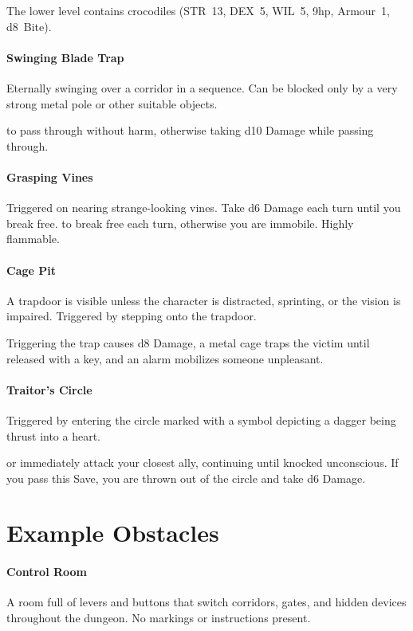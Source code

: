 \documentclass[itdr]{subfiles}
\begin{document}
The lower level contains crocodiles (STR~13, DEX~5, WIL~5, 9hp, Armour~1, d8~Bite).

\paragraph{Swinging Blade Trap}
Eternally swinging over a corridor in a sequence. Can be blocked only by a very strong metal pole or other suitable objects.

 to pass through without harm, otherwise taking d10 Damage while passing through.

\paragraph{Grasping Vines}
Triggered on nearing strange-looking vines. Take d6 Damage each turn until you break free.  to break free each turn, otherwise you are immobile. Highly flammable.

\paragraph{Cage Pit}
A trapdoor is visible unless the character is distracted, sprinting, or the vision is impaired. Triggered by stepping onto the trapdoor.

Triggering the trap causes d8 Damage, a metal cage traps the victim until released with a key, and an alarm mobilizes someone unpleasant.

\paragraph{Traitor's Circle}
Triggered by entering the circle marked with a symbol depicting a dagger being thrust into a heart.

 or immediately attack your closest ally, continuing until knocked unconscious. If you pass this Save, you are thrown out of the circle and take d6 Damage.

\vfill
\break

\section{Example Obstacles}

\paragraph{Control Room}
A room full of levers and buttons that switch corridors, gates, and hidden devices throughout the dungeon. No markings or instructions present.
\end{document}
